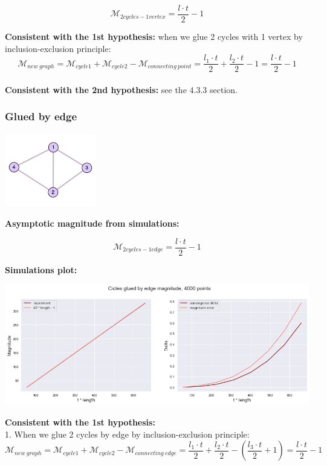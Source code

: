 \documentclass{article}
\begin{document}
$$\mathcal{M}_{2cycles-1vertex} = \frac{l \cdot t}{2} - 1$$


\textbf{Consistent with the 1st hypothesis:} when we glue 2 cycles with 1 vertex by inclusion-exclusion
principle: $$\mathcal{M}_{new \ graph} = \mathcal{M}_{cycle1} + \mathcal{M}_{cycle2} -
\mathcal{M}_{connecting \ point} = \frac{l_1 \cdot t}{2} + \frac{l_2 \cdot t}{2} - 1= \frac{l \cdot t}{2} - 1$$ 
\\

\textbf{Consistent with the 2nd hypothesis:} see the 4.3.3 section. 

\subsubsection{Glued by edge}
\begin{center}
\includegraphics[width=0.3\textwidth]{2cicles_e_exp}
\end{center}

\textbf{Asymptotic magnitude from simulations:}

$$\mathcal{M}_{2cycles-1edge} = \frac{l \cdot t}{2} - 1$$

\textbf{Simulations plot:}
\begin{center}
\includegraphics[width=\textwidth]{cicles_glued_by_edge}
\end{center}

\textbf{Consistent with the 1st hypothesis:} \\

1. When we glue 2 cycles by edge by inclusion-exclusion
principle: $$\mathcal{M}_{new \ graph} = \mathcal{M}_{cycle1} + \mathcal{M}_{cycle2}
- \mathcal{M}_{connecting \ edge} = \frac{l_1 \cdot t}{2} + \frac{l_2 \cdot t}{2} - 
(\frac{l_3 \cdot t}{2} + 1) = \frac{l \cdot t}{2} - 1$$
\\
\end{document}
